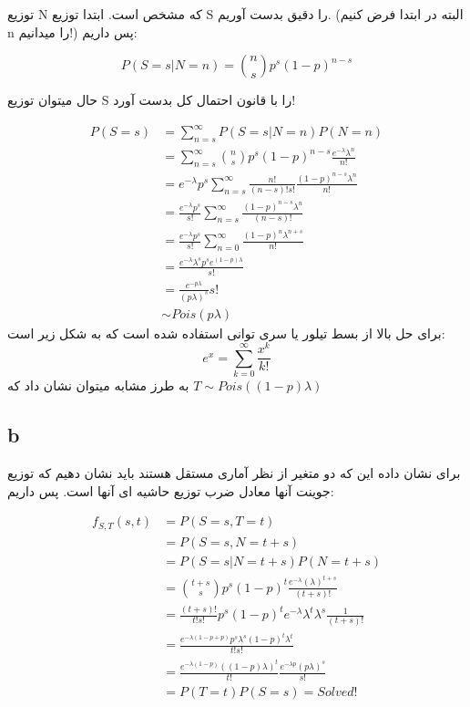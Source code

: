 \documentclass{article}[12pt]
\begin{document}
توزیع N که مشخص است. ابتدا توزیع S را دقیق بدست آوریم. (البته در ابتدا فرض کنیم n را میدانیم!) پس داریم:


\begin{equation}
P(S = s| N=n) = {n \choose s} p^{s} (1-p)^{n-s}
\end{equation}

حال میتوان توزیع S را با قانون احتمال کل بدست آورد!

\begin{equation}
\begin{split}
P(S=s) &= \sum_{n=s}^{\infty} P(S=s|N=n)P(N=n) 
\\ 
&= \sum_{n=s}^{\infty} {n \choose s} p^{s} (1-p)^{n-s}
\frac{e^{-\lambda} \lambda^n}{n!} 
\\
&= e^{-\lambda} p^s
\sum_{n=s}^{\infty} \frac{n!}{(n-s)! s!}
\frac{(1-p)^{n-s} \lambda^n}{n!} 
\\ 
&= \frac{ e^{-\lambda} p^s}{s!} 
\sum_{n=s}^{\infty} \frac{(1-p)^{n-s} \lambda^n}{(n-s)! } 
\\
&= \frac{ e^{-\lambda} p^s}{s!} 
\sum_{n=0}^{\infty} \frac{(1-p)^{n} \lambda^{n+s}}{n!} 
\\
&= \frac{ e^{-\lambda} \lambda^s p^s e^{(1-p)\lambda}}{s!} 
\\
&= 
\frac{e^{-p \lambda}}{(p \lambda)^s}{s!}\\
& \sim Pois(p \lambda) 
\end{split}
\end{equation}
برای حل بالا از بسط تیلور یا سری توانی استفاده شده است که به شکل زیر است:
\begin{equation}
e^x = \sum_{k=0}^{\infty} \frac{x^k}{k!}
\end{equation}
به طرز مشابه میتوان نشان داد که 
$T \sim Pois((1-p)\lambda)$
\subsection{b}
برای نشان داده این که دو متغیر از نظر آماری مستقل هستند باید نشان دهیم که توزیع جوینت آنها معادل ضرب توزیع حاشیه ای آنها است. پس داریم:

\begin{equation}
\begin{split}
f_{S,T}(s,t) &= P(S=s , T=t) 
\\
&= P(S=s , N = t+s ) 
\\
&= P(S=s | N=t+s)P(N=t+s) 
\\
&= 
{t+s \choose s} p^{s} (1-p)^{t}  
\frac{e^{-\lambda}  (\lambda)^{t+s}  }{(t+s)!}
\\
&= 
\frac{(t+s)!}{t! s!} p^s (1-p)^{t} 
e^{-\lambda} \lambda^t \lambda^s 
\frac{1}{(t+s)!}
\\
&= 
\frac{e^{-\lambda(1-p+p)} p^s \lambda^s (1-p)^{t} \lambda^t  }{t! s!}
\\ 
&= 
\frac{e^{-\lambda (1-p )} ((1-p)\lambda)^{t}}{t!}
\frac{e^{-\lambda p} (p\lambda)^s}{s!}
\\
&=
P(T=t) P(S=s) = Solved!
\end{split}
\end{equation}
\end{document}
